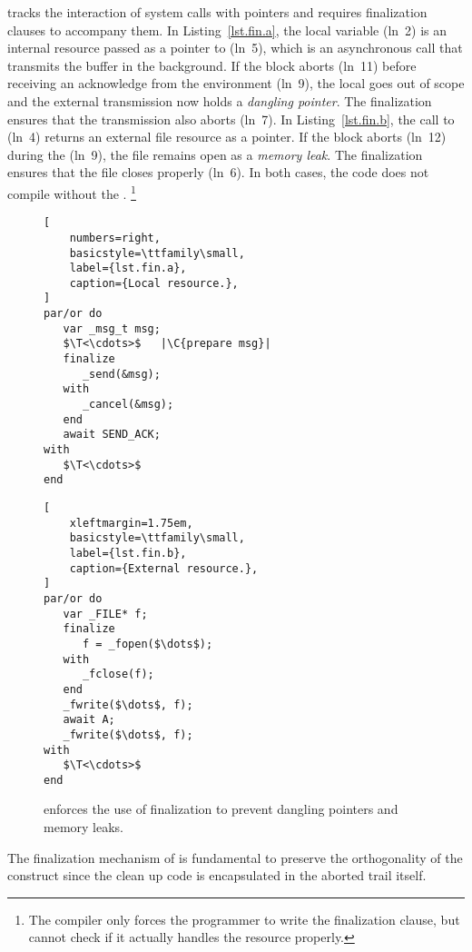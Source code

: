\CEU tracks the interaction of system calls with pointers and requires
finalization clauses to accompany them.
%
In Listing~\ref{lst.fin.a}, the local variable 
(ln~2) is an internal resource passed as a pointer to  (ln~5),
which is an asynchronous call that transmits the buffer in the background.
If the block aborts (ln~11) before receiving an acknowledge from the
environment (ln~9), the local  goes out of scope and the external
transmission now holds a \emph{dangling pointer}.
The finalization ensures that the transmission also aborts (ln~7).
%
In Listing~\ref{lst.fin.b}, the call to  (ln~4) returns an
external file resource as a pointer.
If the block aborts (ln~12) during the  (ln~9), the file
remains open as a \emph{memory leak}.
The finalization ensures that the file closes properly (ln~6).
%
In both cases, the code does not compile without the .%
\footnote{%
The compiler only forces the programmer to write the finalization clause, but
cannot check if it actually handles the resource properly.}

\begin{figure}[b!]
\begin{minipage}[t]{0.46\linewidth}
\begin{lstlisting}[
    numbers=right,
    basicstyle=\ttfamily\small,
    label={lst.fin.a},
    caption={Local resource.},
]
par/or do
   var _msg_t msg;
   $\T<\cdots>$   |\C{prepare msg}|
   finalize
      _send(&msg);
   with
      _cancel(&msg);
   end
   await SEND_ACK;
with
   $\T<\cdots>$
end

\end{lstlisting}
\end{minipage}%
%
\begin{minipage}[t]{0.54\linewidth}
\begin{lstlisting}[
    xleftmargin=1.75em,
    basicstyle=\ttfamily\small,
    label={lst.fin.b},
    caption={External resource.},
]
par/or do
   var _FILE* f;
   finalize
      f = _fopen($\dots$);
   with
      _fclose(f);
   end
   _fwrite($\dots$, f);
   await A;
   _fwrite($\dots$, f);
with
   $\T<\cdots>$
end
\end{lstlisting}
\end{minipage}%
\caption{%
\CEU enforces the use of finalization to prevent dangling pointers and memory leaks.}
\label{lst.fin}
\end{figure}

The finalization mechanism of \CEU is fundamental to preserve the orthogonality
of the  construct since the clean up code is encapsulated in the
aborted trail itself.

